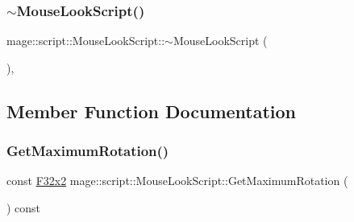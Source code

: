 \hypertarget{classmage_1_1script_1_1_mouse_look_script_a29a6d2cb4742fbf745822d015e72484f}{}\label{classmage_1_1script_1_1_mouse_look_script_a29a6d2cb4742fbf745822d015e72484f} 
\subsubsection{\texorpdfstring{$\sim$\+Mouse\+Look\+Script()}{~MouseLookScript()}}
{\footnotesize\ttfamily mage\+::script\+::\+Mouse\+Look\+Script\+::$\sim$\+Mouse\+Look\+Script (\begin{DoxyParamCaption}{ }\end{DoxyParamCaption})\hspace{0.3cm}{\ttfamily [virtual]}, {\ttfamily [default]}}



\subsection{Member Function Documentation}
\hypertarget{classmage_1_1script_1_1_mouse_look_script_a2ceb928a903baf5b30ea99e321af671c}{}\label{classmage_1_1script_1_1_mouse_look_script_a2ceb928a903baf5b30ea99e321af671c} 
\subsubsection{\texorpdfstring{Get\+Maximum\+Rotation()}{GetMaximumRotation()}}
{\footnotesize\ttfamily const \hyperlink{namespacemage_aa87237ad091f5cd7da612b8523fc108f}{F32x2} mage\+::script\+::\+Mouse\+Look\+Script\+::\+Get\+Maximum\+Rotation (\begin{DoxyParamCaption}{ }\end{DoxyParamCaption}) const\hspace{0.3cm}{\ttfamily [noexcept]}}

\hypertarget{classmage_1_1script_1_1_mouse_look_script_a5d0e63ee050bf07f5c8ad75ca9ced307}{}\label{classmage_1_1script_1_1_mouse_look_script_a5d0e63ee050bf07f5c8ad75ca9ced307} 

